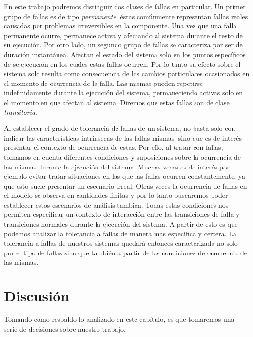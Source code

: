 \documentclass[pdftex,a4paper,12pt]{book}
\begin{document}
En este trabajo podremos distinguir dos clases de fallas en particular. Un primer grupo de fallas es de tipo \textit{permanente}: \'estas com\'unmente representan fallas reales causadas por problemas irreversibles en la componente. Una vez que una falla permanente ocurre, permanece activa y afectando al sistema durante el resto de su ejecuci\'on. Por otro lado, un segundo grupo de fallas se caracteriza por ser de duraci\'on instant\'anea. Afectan el estado del sistema solo en los puntos espec\'ificos de se ejecuci\'on en los cuales estas fallas ocurren. Por lo tanto su efecto sobre el sistema solo resulta como consecuencia de los cambios particulares ocasionados en el momento de ocurrencia de la falla. Las mismas pueden repetirse indefinidamente durante la ejecuci\'on del sistema, permaneciendo activas solo en el momento en que afectan al sistema. Diremos que estas fallas son de clase \textit{transitoria}.

Al establecer el grado de tolerancia de fallas de un sistema, no basta solo con indicar las caracter\'isticas intr\'insecas de las fallas mismas, sino que es de inter\'es presentar el contexto de ocurrencia de estas. Por ello, al tratar con fallas, tomamos en cuenta diferentes condiciones y suposiciones sobre la ocurrencia de las mismas durante la ejecuci\'on del sistema. Muchas veces es de inter\'es por ejemplo evitar tratar situaciones en las que las fallas ocurren constantemente, ya que esto suele presentar un escenario irreal. Otras veces la ocurrencia de fallas en el modelo se observa en cantidades finitas y por lo tanto buscaremos poder establecer estos escenarios de an\'alisis tambi\'en. Todas estas condiciones nos permiten especificar un contexto de interacci\'on entre las transiciones de falla y transiciones normales durante la ejecuci\'on del sistema. A partir de esto es que podemos analizar la tolerancia a fallas de manera mas espec\'ifica y certera. La tolerancia a fallas de nuestros sistemas quedar\'a entonces caracterizada no solo por el tipo de fallas sino que tambi\'en a partir de las condiciones de ocurrencia de las mismas.






\section{Discusi\'on}
Tomando como respaldo lo analizado en este cap\'itulo, es que tomaremos una serie de decisiones sobre nuestro trabajo.
\end{document}
